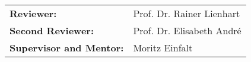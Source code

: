 {
	\vspace*{19.5cm}
	
	\Large{
	\def\arraystretch{1.2}
	\begin{tabular}{l l}
	
		\textbf{Reviewer:} & Prof. Dr. Rainer Lienhart\\
		\textbf{Second Reviewer:} & Prof. Dr. Elisabeth André\\
		\textbf{Supervisor and Mentor:} & Moritz Einfalt
	
	\end{tabular}
	}\par
	
	\def\arraystretch{1}
}
\restoregeometry
\pagebreak